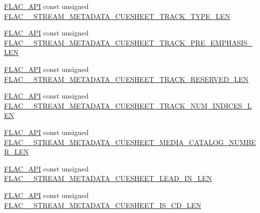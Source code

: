 \begin{DoxyCompactItemize}
\item 
\mbox{\hyperlink{group__flac__export_ga56ca07df8a23310707732b1c0007d6f5}{F\+L\+A\+C\+\_\+\+A\+PI}} const unsigned \mbox{\hyperlink{group__flac__format_ga214d2c105a5712dea76c0a9802843fba}{F\+L\+A\+C\+\_\+\+\_\+\+S\+T\+R\+E\+A\+M\+\_\+\+M\+E\+T\+A\+D\+A\+T\+A\+\_\+\+C\+U\+E\+S\+H\+E\+E\+T\+\_\+\+T\+R\+A\+C\+K\+\_\+\+T\+Y\+P\+E\+\_\+\+L\+EN}}
\item 
\mbox{\hyperlink{group__flac__export_ga56ca07df8a23310707732b1c0007d6f5}{F\+L\+A\+C\+\_\+\+A\+PI}} const unsigned \mbox{\hyperlink{group__flac__format_gaa50843400f847963958b622e32c7afb1}{F\+L\+A\+C\+\_\+\+\_\+\+S\+T\+R\+E\+A\+M\+\_\+\+M\+E\+T\+A\+D\+A\+T\+A\+\_\+\+C\+U\+E\+S\+H\+E\+E\+T\+\_\+\+T\+R\+A\+C\+K\+\_\+\+P\+R\+E\+\_\+\+E\+M\+P\+H\+A\+S\+I\+S\+\_\+\+L\+EN}}
\item 
\mbox{\hyperlink{group__flac__export_ga56ca07df8a23310707732b1c0007d6f5}{F\+L\+A\+C\+\_\+\+A\+PI}} const unsigned \mbox{\hyperlink{group__flac__format_ga1a469393239653b050c7cc3484d33bef}{F\+L\+A\+C\+\_\+\+\_\+\+S\+T\+R\+E\+A\+M\+\_\+\+M\+E\+T\+A\+D\+A\+T\+A\+\_\+\+C\+U\+E\+S\+H\+E\+E\+T\+\_\+\+T\+R\+A\+C\+K\+\_\+\+R\+E\+S\+E\+R\+V\+E\+D\+\_\+\+L\+EN}}
\item 
\mbox{\hyperlink{group__flac__export_ga56ca07df8a23310707732b1c0007d6f5}{F\+L\+A\+C\+\_\+\+A\+PI}} const unsigned \mbox{\hyperlink{group__flac__format_ga34226e52846bbcba46b278f297880637}{F\+L\+A\+C\+\_\+\+\_\+\+S\+T\+R\+E\+A\+M\+\_\+\+M\+E\+T\+A\+D\+A\+T\+A\+\_\+\+C\+U\+E\+S\+H\+E\+E\+T\+\_\+\+T\+R\+A\+C\+K\+\_\+\+N\+U\+M\+\_\+\+I\+N\+D\+I\+C\+E\+S\+\_\+\+L\+EN}}
\item 
\mbox{\hyperlink{group__flac__export_ga56ca07df8a23310707732b1c0007d6f5}{F\+L\+A\+C\+\_\+\+A\+PI}} const unsigned \mbox{\hyperlink{group__flac__format_ga2f453e18dc7e33456cdd744ee7926f83}{F\+L\+A\+C\+\_\+\+\_\+\+S\+T\+R\+E\+A\+M\+\_\+\+M\+E\+T\+A\+D\+A\+T\+A\+\_\+\+C\+U\+E\+S\+H\+E\+E\+T\+\_\+\+M\+E\+D\+I\+A\+\_\+\+C\+A\+T\+A\+L\+O\+G\+\_\+\+N\+U\+M\+B\+E\+R\+\_\+\+L\+EN}}
\item 
\mbox{\hyperlink{group__flac__export_ga56ca07df8a23310707732b1c0007d6f5}{F\+L\+A\+C\+\_\+\+A\+PI}} const unsigned \mbox{\hyperlink{group__flac__format_ga5b9607000b777c7a7be84062754e0363}{F\+L\+A\+C\+\_\+\+\_\+\+S\+T\+R\+E\+A\+M\+\_\+\+M\+E\+T\+A\+D\+A\+T\+A\+\_\+\+C\+U\+E\+S\+H\+E\+E\+T\+\_\+\+L\+E\+A\+D\+\_\+\+I\+N\+\_\+\+L\+EN}}
\item 
\mbox{\hyperlink{group__flac__export_ga56ca07df8a23310707732b1c0007d6f5}{F\+L\+A\+C\+\_\+\+A\+PI}} const unsigned \mbox{\hyperlink{group__flac__format_gacbd3c003cb8dd36e184b57257152cd16}{F\+L\+A\+C\+\_\+\+\_\+\+S\+T\+R\+E\+A\+M\+\_\+\+M\+E\+T\+A\+D\+A\+T\+A\+\_\+\+C\+U\+E\+S\+H\+E\+E\+T\+\_\+\+I\+S\+\_\+\+C\+D\+\_\+\+L\+EN}}

\end{DoxyCompactItemize}
